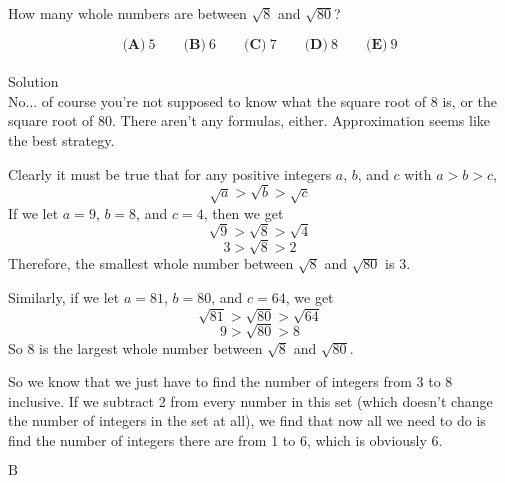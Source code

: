 

How many whole numbers are between $ \sqrt{8}$ and $ \sqrt{80}$?

\[ \textbf{(A)}\ 5 \qquad
\textbf{(B)}\ 6 \qquad
\textbf{(C)}\ 7 \qquad
\textbf{(D)}\ 8 \qquad
\textbf{(E)}\ 9
\]
\\
Solution
\\
No... of course you're not supposed to know what the square root of 8 is, or the square root of 80. There aren't any formulas, either. Approximation seems like the best strategy.

Clearly it must be true that for any positive integers $a$, $b$, and $c$ with $a>b>c$, \[\sqrt{a}>\sqrt{b}>\sqrt{c}\]
If we let $a=9$, $b=8$, and $c=4$, then we get \[\sqrt{9}>\sqrt{8}>\sqrt{4}\]\[3>\sqrt{8}>2\]
Therefore, the smallest whole number between $\sqrt{8}$ and $\sqrt{80}$ is $3$.

Similarly, if we let $a=81$, $b=80$, and $c=64$, we get \[\sqrt{81}>\sqrt{80}>\sqrt{64}\]\[9>\sqrt{80}>8\]
So $8$ is the largest whole number between $\sqrt{8}$ and $\sqrt{80}$.

So we know that we just have to find the number of integers from 3 to 8 inclusive. If we subtract 2 from every number in this set (which doesn't change the number of integers in the set at all), we find that now all we need to do is find the number of integers there are from 1 to 6, which is obviously 6.

$\boxed{\text{B}}$